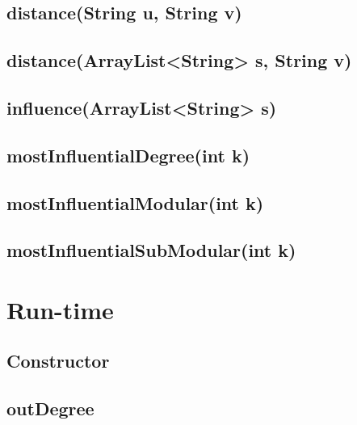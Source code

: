 \documentclass[10pt,letterpaper]{article}
\begin{document}
\subsection{distance(String u, String v)}
\subsection{distance(ArrayList<String> s, String v)}
\subsection{influence(ArrayList<String> s)}
\subsection{mostInfluentialDegree(int k)}
\subsection{mostInfluentialModular(int k)}
\subsection{mostInfluentialSubModular(int k)}
\section{Run-time}
\subsection{Constructor}
\subsection{outDegree}
\end{document}
